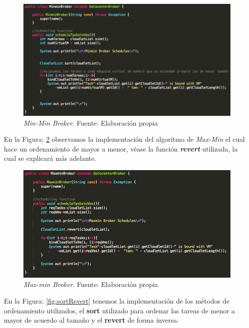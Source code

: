 \renewcommand\thefigure{\arabic{figure}}
\begin{figure}[h!]
	\centering
	\includegraphics[scale=0.4]{media/minmin_broker}
	\caption{\textit{Min-Min Broker}. Fuente: Elaboración propia}
	\label{fig:minminBroker}
\end{figure}

En la Figura: \ref{fig:maxminBroker} observamos la implementación del algoritmo de \textit{Max-Min} el cual hace un ordenamiento de mayor a menor, véase la función \textbf{\textit{revert}} utilizada, la cual se explicará más adelante.

\renewcommand\thefigure{\arabic{figure}}
\begin{figure}[h!]
	\centering
	\includegraphics[scale=0.4]{media/maxmin_broker}
	\caption{\textit{Max-min Broker}. Fuente: Elaboración propia}
	\label{fig:maxminBroker}
\end{figure}

\newpage
En la Figura: \ref{fig:sortRevert} tenemos la implementación de los métodos de ordenamiento utilizados, el \textbf{sort} utilizado para ordenar las tareas de menor a mayor de acuerdo al tamaño y el \textbf{revert} de forma inversa.

